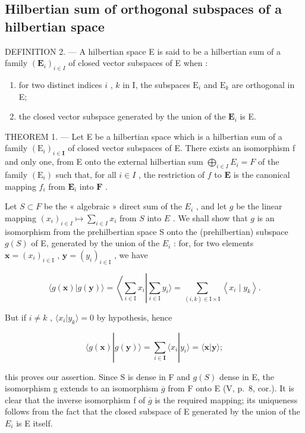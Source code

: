 \subsection{Hilbertian sum of orthogonal subspaces of a hilbertian space}

DEFINITION 2. --- A hilbertian space E is said to be a hilbertian sum of a family \((\mathbf{E}_{i})_{i\in I}\) of closed vector subspaces of E when :

\begin{enumerate}
\def\labelenumi{\arabic{enumi})}
\item
  for two distinct indices \(i\) , \(k\) in I, the subspaces \(\mathrm{E}_i\) and \(\mathrm{E}_k\) are orthogonal in E;
\item
  the closed vector subspace generated by the union of the \(\mathbf{E}_i\) is E.
\end{enumerate}

THEOREM 1. --- Let E be a hilbertian space which is a hilbertian sum of a family \((\mathrm{E}_{i})_{i\in\mathbf{I}}\) of closed vector subspaces of E. There exists an isomorphism f and only one, from E onto the external hilbertian sum \(\bigoplus_{i\in I}E_{i}=F\) of the family \((\mathrm{E}_{i})\) such that, for all \(i\in I\) , the restriction of \(f\) to \(\mathbf{E}\) is the canonical mapping \(f_{i}\) from \(\mathbf{E}_i\) into \(\mathbf{F}\) .

Let \(S \subset F\) be the « algebraic » direct sum of the \(E_i\) , and let \(g\) be the linear mapping \((x_i)_{i \in I} \mapsto \sum_{i \in I} x_i\) from \(S\) into \(E\) . We shall show that \(g\) is an isomorphism from the prehilbertian space S onto the (prehilbertian) subspace \(g(S)\) of E, generated by the union of the \(E_{i}\) : for, for two elements \(\mathbf{x} = (x_{i})_{i \in \mathrm{I}}\) , \(\mathbf{y} = (y_{i})_{i \in \mathrm{I}}\) , we have

\[
\langle g (\mathbf {x}) | g (\mathbf {y}) \rangle = \left\langle \sum_ {i \in \mathrm{I}} x _ {i} \right| \sum_ {i \in \mathrm{I}} y _ {i} \rangle = \sum_ {(i, k) \in \mathrm{I} \times \mathrm{I}} \left\langle x _ {i} \mid y _ {k} \right\rangle .
\]

But if \(i \neq k\) , \(\langle x_i | y_k \rangle = 0\) by hypothesis, hence

\[
\langle g (\mathbf {x}) | g (\mathbf {y}) \rangle = \sum_ {i \in \mathbf {I}} \langle x _ {i} | y _ {i} \rangle = \langle \mathbf {x} | \mathbf {y} \rangle ;
\]

this proves our assertion. Since S is dense in F and \(g(S)\) dense in E, the isomorphism g extends to an isomorphism \(\overline{g}\) from F onto E (V, p.~8, cor.). It is clear that the inverse isomorphism f of \(\overline{g}\) is the required mapping; its uniqueness follows from the fact that the closed subspace of E generated by the union of the \(E_{i}\) is E itself.

